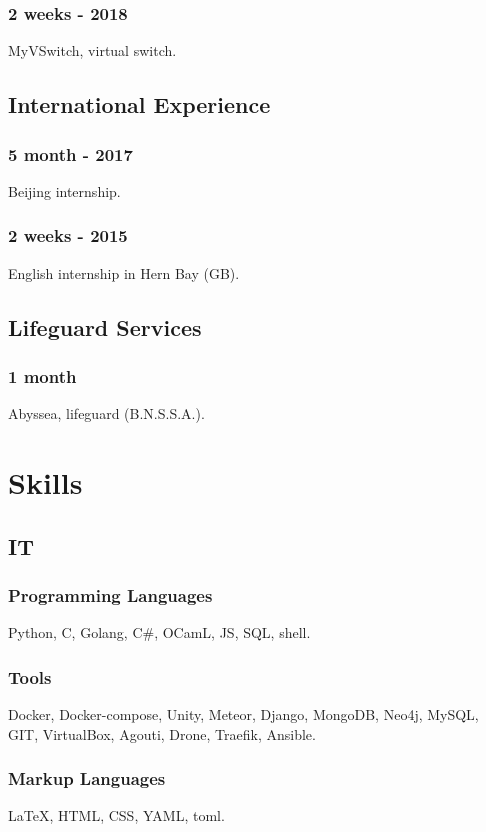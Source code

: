 \documentclass{article}
\begin{document}
\begin{multicols}{2}
                \subsubsection{2 weeks - 2018}
                    MyVSwitch, virtual switch.
            \subsection{International Experience}
                \subsubsection{5 month - 2017}
                    Beijing internship.
                \subsubsection{2 weeks - 2015}
                    English internship in Hern Bay (GB).
            \subsection{Lifeguard Services}
                \subsubsection{1 month}
                    Abyssea, lifeguard (B.N.S.S.A.).

        \columnbreak

        \section{Skills}
            \subsection{IT}
                \subsubsection{Programming Languages}
                    Python, C, Golang, C\#, OCamL, JS, SQL, shell.
                \subsubsection{Tools}
                    Docker, Docker-compose, Unity, Meteor, Django,  MongoDB, Neo4j, MySQL, GIT, VirtualBox, Agouti, Drone, Traefik, Ansible.
                \subsubsection{Markup Languages}
                    {\LaTeX}, HTML, CSS, YAML, toml.

\end{multicols}
\end{document}
